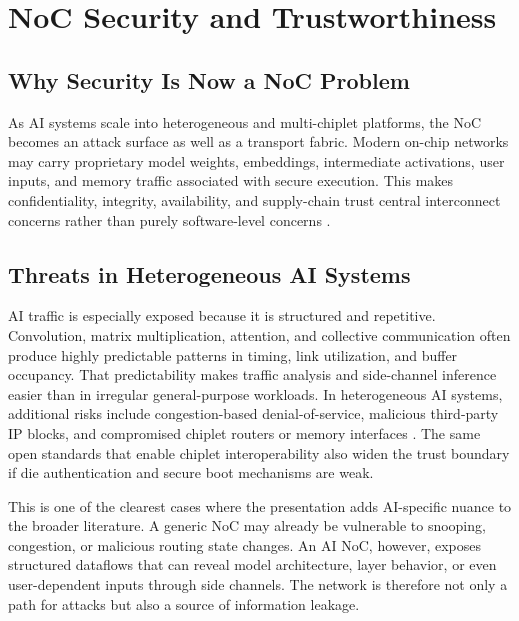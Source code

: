 \section{NoC Security and Trustworthiness}
\label{sec:security}

\subsection{Why Security Is Now a NoC Problem}

As AI systems scale into heterogeneous and multi-chiplet platforms, the NoC becomes an attack surface as well as a transport fabric. Modern on-chip networks may carry proprietary model weights, embeddings, intermediate activations, user inputs, and memory traffic associated with secure execution. This makes confidentiality, integrity, availability, and supply-chain trust central interconnect concerns rather than purely software-level concerns \cite{charles2022survey,weerasena2024security}.

\subsection{Threats in Heterogeneous AI Systems}

AI traffic is especially exposed because it is structured and repetitive. Convolution, matrix multiplication, attention, and collective communication often produce highly predictable patterns in timing, link utilization, and buffer occupancy. That predictability makes traffic analysis and side-channel inference easier than in irregular general-purpose workloads. In heterogeneous AI systems, additional risks include congestion-based denial-of-service, malicious third-party IP blocks, and compromised chiplet routers or memory interfaces \cite{pasricha2022electronic,sarihi2021survey}. The same open standards that enable chiplet interoperability also widen the trust boundary if die authentication and secure boot mechanisms are weak.

This is one of the clearest cases where the presentation adds AI-specific nuance to the broader literature. A generic NoC may already be vulnerable to snooping, congestion, or malicious routing state changes. An AI NoC, however, exposes structured dataflows that can reveal model architecture, layer behavior, or even user-dependent inputs through side channels. The network is therefore not only a path for attacks but also a source of information leakage.


